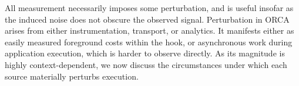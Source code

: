 All measurement necessarily imposes some perturbation, and is useful insofar as
the induced noise does not obscure the observed signal.
Perturbation in ORCA arises from either instrumentation, transport, or analytics.
It manifests either as easily measured foreground costs
within the \ocpta{} hook, or
asynchronous work during application execution, which is harder to observe directly.
As its magnitude is highly context-dependent, we now discuss the circumstances under
which each source materially perturbs execution.

